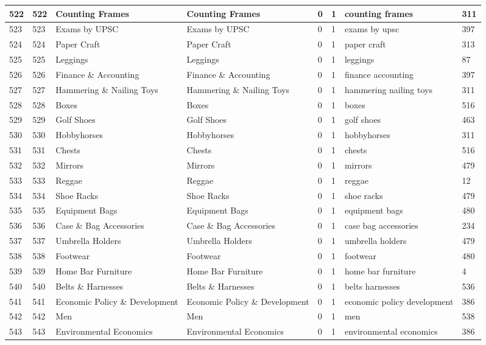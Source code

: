 \begin{longtable}{|l|l|l|l|l|l|l|l|}
522 & 522 & Counting Frames & Counting Frames & 0 & 1 & counting frames & 311 \\ \hline 
523 & 523 & Exams by UPSC & Exams by UPSC & 0 & 1 & exams by upsc & 397 \\ \hline 
524 & 524 & Paper Craft & Paper Craft & 0 & 1 & paper craft & 313 \\ \hline 
525 & 525 & Leggings & Leggings & 0 & 1 & leggings & 87 \\ \hline 
526 & 526 & Finance \& Accounting & Finance \& Accounting & 0 & 1 & finance accounting & 397 \\ \hline 
527 & 527 & Hammering \& Nailing Toys & Hammering \& Nailing Toys & 0 & 1 & hammering nailing toys & 311 \\ \hline 
528 & 528 & Boxes & Boxes & 0 & 1 & boxes & 516 \\ \hline 
529 & 529 & Golf Shoes & Golf Shoes & 0 & 1 & golf shoes & 463 \\ \hline 
530 & 530 & Hobbyhorses & Hobbyhorses & 0 & 1 & hobbyhorses & 311 \\ \hline 
531 & 531 & Chests & Chests & 0 & 1 & chests & 516 \\ \hline 
532 & 532 & Mirrors & Mirrors & 0 & 1 & mirrors & 479 \\ \hline 
533 & 533 & Reggae & Reggae & 0 & 1 & reggae & 12 \\ \hline 
534 & 534 & Shoe Racks & Shoe Racks & 0 & 1 & shoe racks & 479 \\ \hline 
535 & 535 & Equipment Bags & Equipment Bags & 0 & 1 & equipment bags & 480 \\ \hline 
536 & 536 & Case \& Bag Accessories & Case \& Bag Accessories & 0 & 1 & case bag accessories & 234 \\ \hline 
537 & 537 & Umbrella Holders & Umbrella Holders & 0 & 1 & umbrella holders & 479 \\ \hline 
538 & 538 & Footwear & Footwear & 0 & 1 & footwear & 480 \\ \hline 
539 & 539 & Home Bar Furniture & Home Bar Furniture & 0 & 1 & home bar furniture & 4 \\ \hline 
540 & 540 & Belts \& Harnesses & Belts \& Harnesses & 0 & 1 & belts harnesses & 536 \\ \hline 
541 & 541 & Economic Policy \& Development & Economic Policy \& Development & 0 & 1 & economic policy development & 386 \\ \hline 
542 & 542 & Men & Men & 0 & 1 & men & 538 \\ \hline 
543 & 543 & Environmental Economics & Environmental Economics & 0 & 1 & environmental economics & 386 \\ \hline 

\end{longtable}
